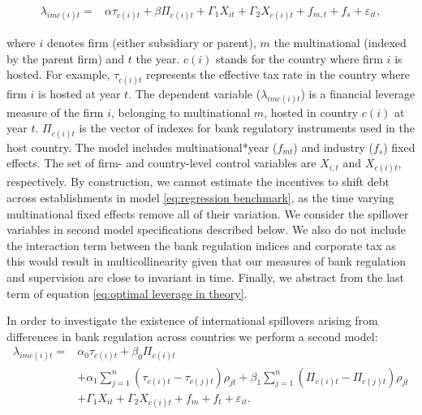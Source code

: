 \documentclass[12pt]{article}
\begin{document}
	\begin{equation}
	\begin{aligned}
	\lambda_{imc(i)t}=&\alpha\tau_{c(i)t}+\beta\Pi_{c(i)t}+\Gamma_1 X_{it}+\Gamma_2 X_{c(i)t}+f_{m,t}+f_{s}+\varepsilon_{it},
	\label{eq:regression benchmark}
	\end{aligned}
	\end{equation}
	
		where $i$ denotes firm (either subsidiary or parent), $m$ the multinational (indexed by the parent firm) and $t$ the year. $c(i)$ stands for the country where firm $i$ is hosted. For example, $\tau_{c(i)t}$ represents the effective tax rate in the country where firm $i$ is hosted at year $t$. The dependent variable ($\lambda_{imc(i)t}$) is a financial leverage measure of the firm $i$, belonging to multinational $m$, hosted in country $c(i)$ at year $t$. $\Pi_{c(i)t}$ is the vector of indexes for bank regulatory instruments used in the host country. The model includes multinational*year ($f_{mt}$) and industry ($f_s$) fixed effects. The set of firm- and country-level control variables are $X_{i,t}$ and $X_{c(i)t}$, respectively. By construction, we cannot estimate the incentives to shift debt across establishments in model \ref{eq:regression benchmark}, as the time varying multinational fixed effects remove all of their variation. We consider the spillover variables in second model specifications described below. We also do not include the interaction term between the bank regulation indices and corporate tax as this would result in multicollinearity given that our measures of bank regulation and supervision are close to invariant in time. Finally, we abstract from the last term of equation \ref{eq:optimal leverage in theory}.	
	
In order to investigate the existence of international spillovers arising from differences in bank regulation across countries we perform a second model: 
	\begin{equation}
	\begin{aligned}
	\lambda_{imc(i)t}=&\alpha_0\tau_{c(i)t}+\beta_0\Pi_{c(i)t}\\
	&+\alpha_1\sum_{j=1}^{n}(\tau_{c(i)t}-\tau_{c(j)t})\rho_{jt}+\beta_1\sum_{j=1}^{n}(\Pi_{c(i)t}-\Pi_{c(j)t})\rho_{jt}\\
	&+\Gamma_1 X_{it}+\Gamma_2 X_{c(i)t}+f_{m}+f_{t}+\varepsilon_{it}.
	\label{eq:regression spillover}
	\end{aligned}
	\end{equation}
	
\end{document}
